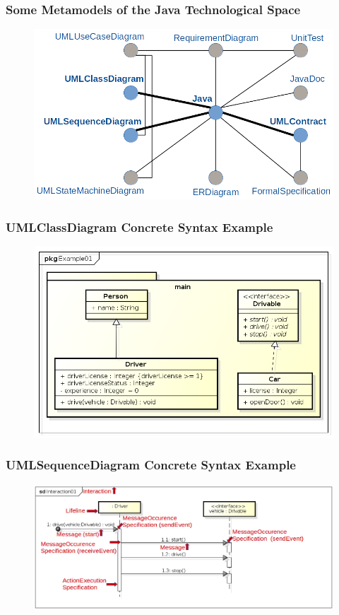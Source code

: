 \documentclass{beamer}
\begin{document}
\begin{frame}
	\frametitle{Some Metamodels of the Java Technological Space}
	\begin{figure}
		\vskip -5pt
		\includegraphics[scale=0.3]{network_metamodels_java}
	\end{figure}
\end{frame}

\begin{frame}
	\frametitle{UMLClassDiagram Concrete Syntax Example}
	\nocite{omg2007unified}
	\begin{figure}[H]
		\includegraphics[width=.8\textwidth]{umlClassDiagramExample01_Diagram}
	\end{figure}
\end{frame}

\begin{frame}[t]
	\frametitle{UMLSequenceDiagram Concrete Syntax Example}
	\begin{figure}[H]
   		\includegraphics[width=\textwidth]{umlSequenceDiagramExample01_Diagram}
	\end{figure}
\end{frame}
\end{document}

